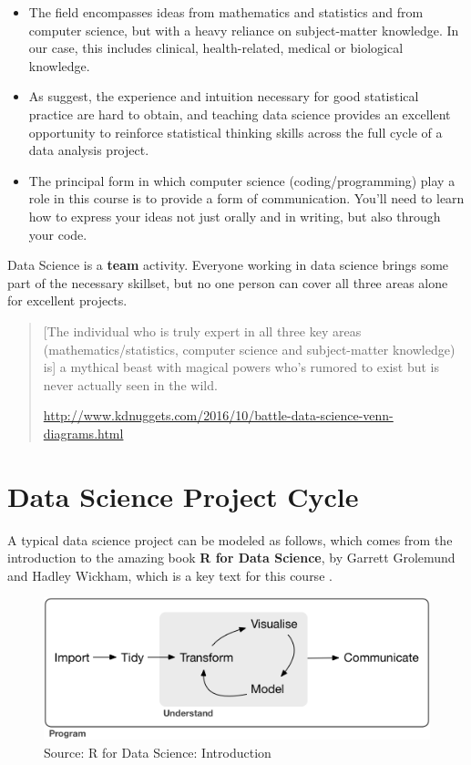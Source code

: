 \documentclass[
]{book}
\providecommand{\tightlist}{%
  \setlength{\itemsep}{0pt}\setlength{\parskip}{0pt}}
\begin{document}
\begin{itemize}
\tightlist
\item
  The field encompasses ideas from mathematics and statistics and from computer science, but with a heavy reliance on subject-matter knowledge. In our case, this includes clinical, health-related, medical or biological knowledge.
\item
  As \citet{Gelman-Nolan} suggest, the experience and intuition necessary for good statistical practice are hard to obtain, and teaching data science provides an excellent opportunity to reinforce statistical thinking skills across the full cycle of a data analysis project.
\item
  The principal form in which computer science (coding/programming) play a role in this course is to provide a form of communication. You'll need to learn how to express your ideas not just orally and in writing, but also through your code.
\end{itemize}

Data Science is a \textbf{team} activity. Everyone working in data science brings some part of the necessary skillset, but no one person can cover all three areas alone for excellent projects.

\begin{quote}
{[}The individual who is truly expert in all three key areas (mathematics/statistics, computer science and subject-matter knowledge) is{]} a mythical beast with magical powers who's rumored to exist but is never actually seen in the wild.

\url{http://www.kdnuggets.com/2016/10/battle-data-science-venn-diagrams.html}
\end{quote}

\hypertarget{data-science-project-cycle}{%
\section{Data Science Project Cycle}\label{data-science-project-cycle}}

A typical data science project can be modeled as follows, which comes from the introduction to the amazing book \textbf{R for Data Science}, by Garrett Grolemund and Hadley Wickham, which is a key text for this course \citep{R4DS}.

\begin{figure}
\includegraphics[width=0.95\linewidth]{figures/data-science-cycle} \caption{Source: R for Data Science: Introduction}\label{fig:cycle-fig}
\end{figure}
\end{document}
